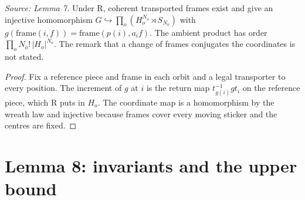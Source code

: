 \begin{theorem}[Lemma 7]
  \label{thm:lemma-seven}
  \leanok
  \textit{Source: Lemma 7.}
  Under R, coherent transported frames exist and give an injective
  homomorphism \(G\hookrightarrow\prod_o(H_o^{N_o}\rtimes S_{N_o})\) with
  \(g(\mathrm{frame}(i,f))=\mathrm{frame}(p(i),a_if)\). The ambient product
  has order \(\prod_oN_o!\,|H_o|^{N_o}\). The remark that a change of
  frames conjugates the coordinates is not stated.
\end{theorem}
\begin{proof}
  \leanok
  Fix a reference piece and frame in each orbit and a legal transporter to
  every position. The increment of \(g\) at \(i\) is the return map
  \(t_{g(i)}^{-1}gt_i\) on the reference piece, which R puts in \(H_o\).
  The coordinate map is a homomorphism by the wreath law and injective
  because frames cover every moving sticker and the centres are fixed.
\end{proof}

\section{Lemma 8: invariants and the upper bound}

